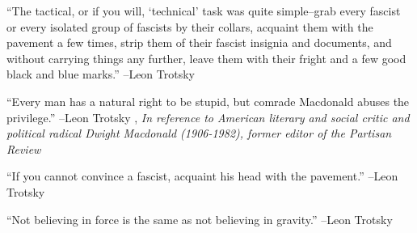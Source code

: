 \documentclass{article}%
\begin{document}
\linebreak%
\vspace{1mm}%
\begin{minipage}{\textwidth}%
\flushleft%
“The tactical, or if you will, ‘technical’ task was quite simple–grab every fascist or every isolated group of fascists by their collars, acquaint them with the pavement a few times, strip them of their fascist insignia and documents, and without carrying things any further, leave them with their fright and a few good black and blue marks.”%
\linebreak%
\vspace{1mm}%
–Leon Trotsky%
\linebreak%
\vspace{1mm}%
\end{minipage}%
\linebreak%
\vspace{1mm}%
\begin{minipage}{\textwidth}%
\flushleft%
“Every man has a natural right to be stupid, but comrade Macdonald abuses the privilege.”%
\linebreak%
\vspace{1mm}%
–Leon Trotsky%
, \textit{In reference to American literary and social critic and political radical Dwight Macdonald (1906-1982), former editor of the Partisan Review}%
\linebreak%
\vspace{1mm}%
\end{minipage}%
\linebreak%
\vspace{1mm}%
\begin{minipage}{\textwidth}%
\flushleft%
“If you cannot convince a fascist, acquaint his head with the pavement.”%
\linebreak%
\vspace{1mm}%
–Leon Trotsky%
\linebreak%
\vspace{1mm}%
\end{minipage}%
\linebreak%
\vspace{1mm}%
\begin{minipage}{\textwidth}%
\flushleft%
“Not believing in force is the same as not believing in gravity.”%
\linebreak%
\vspace{1mm}%
–Leon Trotsky%
\linebreak%
\vspace{1mm}%
\end{minipage}%
\end{document}
